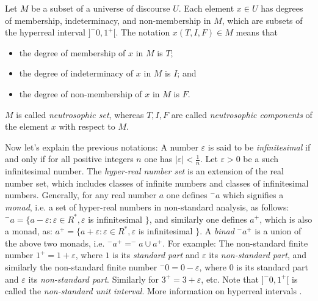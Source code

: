 \documentclass[12pt]{article}
\begin{document}
Let $M$ be a subset of a universe of discourse $U$. Each element 
$x\in U$ has degrees of membership, indeterminacy, and non-membership 
in $M$, which are subsets of the hyperreal interval $]^-0,1^+[$. The 
notation $x(T, I, F) \in M$ means that
 \begin{itemize}
 \item the degree of membership of $x$ in $M$ is $T$;
 \item the degree of indeterminacy of $x$ in $M$ is $I$; and
 \item the degree of non-membership of $x$ in $M$ is $F$.
 \end{itemize}

$M$ is called \emph{neutrosophic set}, whereas $T, I, F$ are called \emph{neutrosophic components} of the element $x$ with respect to $M$.

Now let's explain the previous notations:
\newline A number $\varepsilon$ is said to be \emph{infinitesimal} if and only if for all positive integers $n$ one has $|\varepsilon| < \frac{1}{n}$.  Let $\varepsilon > 0$ be a such infinitesimal number.  The \emph{hyper-real number set} is an  extension of the real number set, which includes classes of infinite numbers and classes of infinitesimal numbers.  
\newline Generally, for any real number $a$ one defines $^-a$ which signifies a \emph{monad}, i.e. a set of hyper-real numbers in non-standard analysis, as follows:
\newline $^-a = \{a-\varepsilon: \varepsilon \in R^*, \varepsilon$ is infinitesimal $\}$,
\newline and similarly one defines $a^+$, which is also a monad, as:
\newline $a^+ = \{a+\varepsilon: \varepsilon \in R^*, \varepsilon$ is infinitesimal $\}$.
\newline A \emph{binad} $^-a^+$ is a union of the above two monads, i.e.
\newline $ ^-a^+ = ^-a \cup a^+$.
\newline For example: The non-standard finite number $1^+ = 1+\varepsilon$, where $1$ is its \emph{standard part} and $\varepsilon$ its \emph{non-standard part}, and similarly the non-standard finite number $^-0 = 0-\varepsilon$, where $0$ is its standard part and $\varepsilon$ its \emph{non-standard part}.
\newline Similarly for $3^+ = 3+ \varepsilon$, etc.
\newline Note that $] ^-0, 1^+ [$ is called the \emph{non-standard unit interval}.  
\newline More information on hyperreal intervals .
\end{document}
